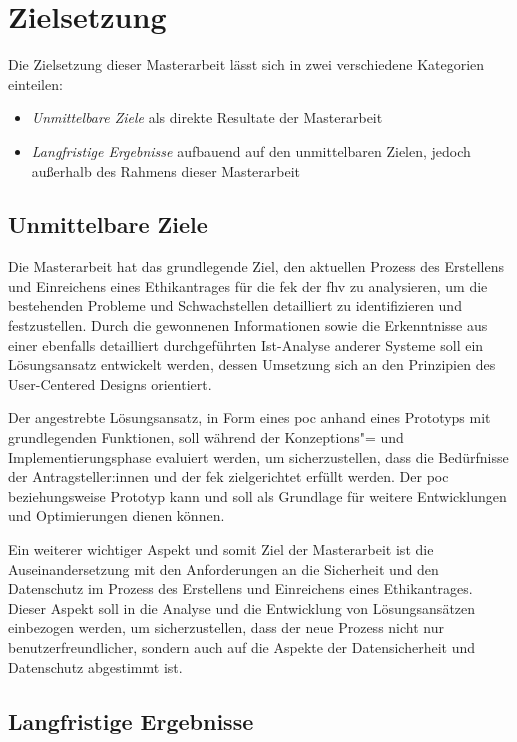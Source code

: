\documentclass[a4paper,12pt,twoside]{scrreprt}
\begin{document}
\section{Zielsetzung}
\label{sec:zielsetzung}

Die Zielsetzung dieser Masterarbeit lässt sich in zwei verschiedene Kategorien einteilen:
\begin{itemize}
    \item \textit{Unmittelbare Ziele} als direkte Resultate der Masterarbeit
    \item \textit{Langfristige Ergebnisse} aufbauend auf den unmittelbaren Zielen, jedoch außerhalb des Rahmens dieser Masterarbeit
\end{itemize}

\subsection{Unmittelbare Ziele}
\label{sub-sec:unmittelbare-ziele}

Die Masterarbeit hat das grundlegende Ziel, den aktuellen Prozess des Erstellens und Einreichens eines Ethikantrages für die \acl{fek} der \acl{fhv} zu analysieren, um die bestehenden Probleme und Schwachstellen detailliert zu identifizieren und festzustellen. Durch die gewonnenen Informationen sowie die Erkenntnisse aus einer ebenfalls detailliert durchgeführten Ist-Analyse anderer Systeme soll ein Lösungsansatz entwickelt werden, dessen Umsetzung sich an den Prinzipien des User-Centered Designs orientiert.

Der angestrebte Lösungsansatz, in Form eines \ac{poc} anhand eines Prototyps mit grundlegenden Funktionen, soll während der Konzeptions"= und Implementierungsphase evaluiert werden, um sicherzustellen, dass die Bedürfnisse der Antragsteller:innen und der \acl{fek} zielgerichtet erfüllt werden. Der \ac{poc} beziehungsweise Prototyp kann und soll als Grundlage für weitere Entwicklungen und Optimierungen dienen können.

Ein weiterer wichtiger Aspekt und somit Ziel der Masterarbeit ist die Auseinandersetzung mit den Anforderungen an die Sicherheit und den Datenschutz im Prozess des Erstellens und Einreichens eines Ethikantrages. Dieser Aspekt soll in die Analyse und die Entwicklung von Lösungsansätzen einbezogen werden, um sicherzustellen, dass der neue Prozess nicht nur benutzerfreundlicher, sondern auch auf die Aspekte der Datensicherheit und Datenschutz abgestimmt ist.

\subsection{Langfristige Ergebnisse}
\label{sub-sec:langfristige-ergebnisse}
\end{document}
